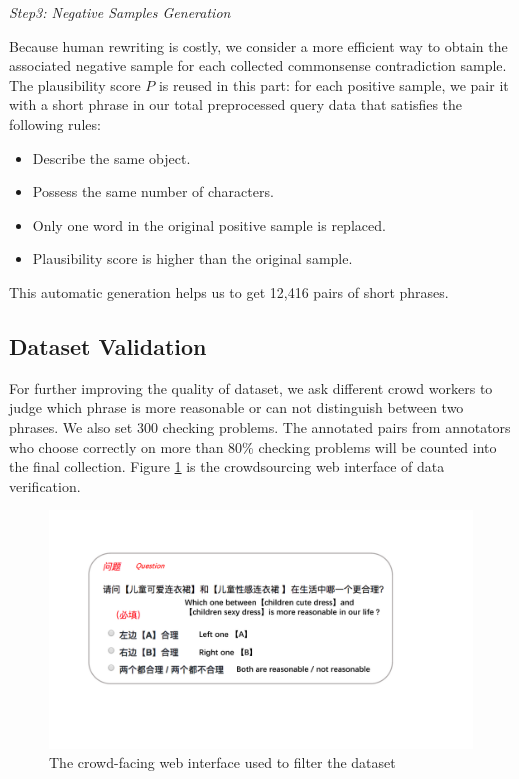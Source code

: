 \textit{Step3: Negative Samples Generation}

Because human rewriting is costly, we consider a more efficient way to obtain the associated negative sample 
for each collected commonsense contradiction sample. The plausibility score $P$ is reused in this part: for each positive sample,
we pair it with a short phrase in our total preprocessed query data that satisfies the following rules:
\begin{itemize}
	\item Describe the same object.
	\item Possess the same number of characters.
	\item Only one word in the original positive sample is replaced. %
	\item Plausibility score is higher than the original sample.
\end{itemize}

This automatic generation helps us to get 12,416 pairs of short phrases.

\subsection{Dataset Validation}
For further improving the quality of dataset, we ask different crowd workers to judge which phrase is more reasonable or can not distinguish between two phrases. We also set 300 checking problems. The annotated pairs from annotators who choose correctly on more than 80\% checking problems will be counted into the final collection. Figure \ref{fig:crowd} is the crowdsourcing web interface of data verification.

\begin{figure}
	\centering
	\includegraphics[width=0.95\columnwidth]{images/crowdPage.pdf}
	\caption{The crowd-facing web interface used to filter the dataset}
	\label{fig:crowd}
\end{figure}

